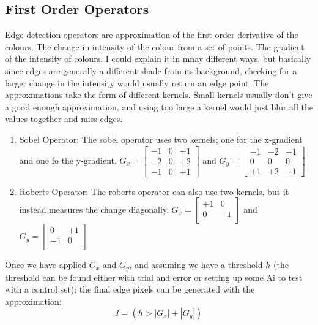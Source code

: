 \subsection{First Order Operators}
Edge detection operators are approximation of the first order derivative of the colours. The change in intensity of the colour from a set of points. The gradient of the intensity of colours. I could explain it in mnay different ways, but basically since edges are generally a different shade from its background, checking for a larger change in the intensity would usually return an edge point.
\newline
The approximations take the form of different kernels. Small kernels usually don't give a good enough approximation, and using too large a kernel would just blur all the values together and miss edges.
\begin{enumerate}
	\item Sobel Operator: The sobel operator uses two kernels; one for the x-gradient and one fo the y-gradient. $G_x =
	\begin{bmatrix}
		-1 & 0 & +1 \\
		-2 & 0 & +2 \\
		-1 & 0 & +1
	\end{bmatrix}$ and $G_y = 
		\begin{bmatrix}
	-1 & -2 & -1 \\
	0 & 0 & 0 \\
	+1 & +2 & +1
	\end{bmatrix}$
	\item Roberts Operator: The roberts operator can also use two kernels, but it instead measures the change diagonally. $G_x =
	\begin{bmatrix}
	+1 & 0 \\
	0 & -1 \\
	\end{bmatrix}$ and $G_y = 
	\begin{bmatrix}
	0 & +1 \\
	-1 & 0 \\
	\end{bmatrix}$
\end{enumerate}

Once we have applied $G_x$ and $G_y$, and assuming we have a threshold $h$ (the threshold can be found either with trial and error or setting up some Ai to test with a control set); the final edge pixels can be generated with the approximation:
\begin{equation}
I = (h > \left| G_x \right|  + \left| G_y \right| )
\end{equation}

